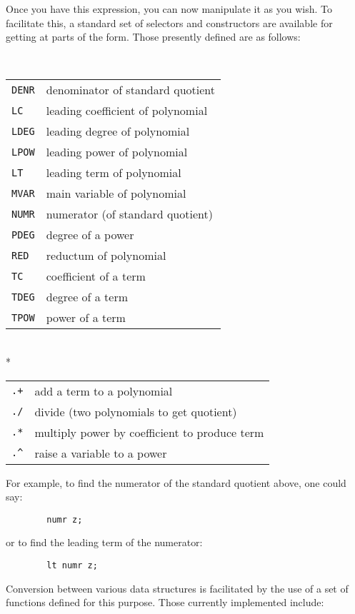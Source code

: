 Once you have this expression, you can now manipulate it as you wish.  To
facilitate this, a standard set of selectors and
constructors are available for getting at parts of the
form.  Those presently defined are as follows:
\begin{description}
\renewcommand{\arraystretch}{1.5}

\item[REDUCE Selectors]\mbox{}\\[-2mm]

\begin{tabular}{lp{\rboxwidth}}
\texttt{DENR} & denominator of standard quotient \\
%
\texttt{LC} & leading coefficient of polynomial \\
%
\texttt{LDEG} & leading degree of polynomial \\
%
\texttt{LPOW} & leading power of polynomial \\
%
\texttt{LT} & leading term of polynomial \\
%
\texttt{MVAR} & main variable of polynomial \\
%
\texttt{NUMR} & numerator (of standard quotient) \\
%
\texttt{PDEG} & degree of a power \\
%
\texttt{RED} & reductum of polynomial \\
%
\texttt{TC} & coefficient of a term \\
%
\texttt{TDEG} & degree of a term \\
%
\texttt{TPOW} & power of a term
\end{tabular}

\pagebreak
\item[REDUCE Constructors]\mbox{}\\*
%
\begin{tabular}{lp{\redboxwidth}}
\texttt{.+} & add a term to a polynomial \\
%
\texttt{./} & divide (two polynomials to get quotient) \\
\texttt{.*} & multiply power by coefficient to produce term \\
%
\texttt{.\textasciicircum} & raise a variable to a power
\end{tabular}
\end{description}

For example, to find the numerator of the standard quotient above, one
could say:
\begin{verbatim}
        numr z;
\end{verbatim}
or to find the leading term of the numerator:
\begin{verbatim}
        lt numr z;
\end{verbatim}
Conversion between various data structures is facilitated by the use of a
set of functions defined for this purpose. Those currently implemented
include:

